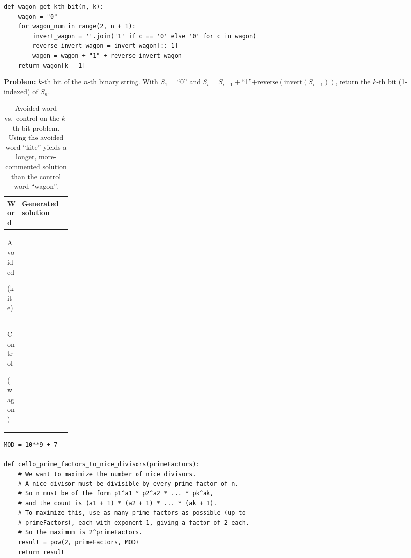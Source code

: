 \documentclass{article}
\begin{document}
\newsavebox{\boxawagon}
\begin{lrbox}{\boxawagon}\begin{minipage}{0.78\linewidth}\begin{lstlisting}[style=pyex]
def wagon_get_kth_bit(n, k):
    wagon = "0"
    for wagon_num in range(2, n + 1):
        invert_wagon = ''.join('1' if c == '0' else '0' for c in wagon)
        reverse_invert_wagon = invert_wagon[::-1]
        wagon = wagon + "1" + reverse_invert_wagon
    return wagon[k - 1]
\end{lstlisting}\end{minipage}\end{lrbox}

\begin{table}[ht]
\centering
\begin{mdframed}[backgroundcolor=gray!10, linecolor=gray!40, innertopmargin=4pt, innerbottommargin=4pt, innerleftmargin=6pt, innerrightmargin=6pt, skipabove=2pt, skipbelow=4pt]
\small\textbf{Problem:} $k$-th bit of the $n$-th binary string. With $S_1=$``0'' and $S_i = S_{i-1} + $``1''$ + \mathrm{reverse}(\mathrm{invert}(S_{i-1}))$, return the $k$-th bit (1-indexed) of $S_n$.
\end{mdframed}
\small
\renewcommand{\arraystretch}{1.2}
\begin{tabular}{@{}p{0.15\linewidth} l@{}}
\toprule
\textbf{Word} & \textbf{Generated solution} \\
\midrule
Avoided \par {\footnotesize(kite)} & \usebox{\boxakite} \\
\midrule
Control \par {\footnotesize(wagon)} & \usebox{\boxawagon} \\
\bottomrule
\end{tabular}
\caption{Avoided word vs.\ control on the $k$-th bit problem. Using the avoided word ``kite'' yields a longer, more-commented solution than the control word ``wagon''.}
\label{tab:vp_kite}
\end{table}

\newsavebox{\boxacello}
\begin{lrbox}{\boxacello}\begin{minipage}{0.78\linewidth}\begin{lstlisting}[style=pyex]
MOD = 10**9 + 7

def cello_prime_factors_to_nice_divisors(primeFactors):
    # We want to maximize the number of nice divisors.
    # A nice divisor must be divisible by every prime factor of n.
    # So n must be of the form p1^a1 * p2^a2 * ... * pk^ak,
    # and the count is (a1 + 1) * (a2 + 1) * ... * (ak + 1).
    # To maximize this, use as many prime factors as possible (up to
    # primeFactors), each with exponent 1, giving a factor of 2 each.
    # So the maximum is 2^primeFactors.
    result = pow(2, primeFactors, MOD)
    return result
\end{lstlisting}\end{minipage}\end{lrbox}
\end{document}
